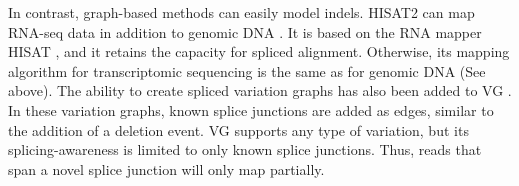 In contrast, graph-based methods can easily model indels.
HISAT2 can map RNA-seq data in addition to genomic DNA \cite{Kim_2019}.
It is based on the RNA mapper HISAT \cite{Kim_2015}, and it retains the capacity for spliced alignment.
Otherwise, its mapping algorithm for transcriptomic sequencing is the same as for genomic DNA (See above).
The ability to create spliced variation graphs has also been added to VG \cite{Garrison_2018}. 
In these variation graphs, known splice junctions are added as edges, similar to the addition of a deletion event.
VG supports any type of variation, but its splicing-awareness is limited to only known splice junctions.
Thus, reads that span a novel splice junction will only map partially.








